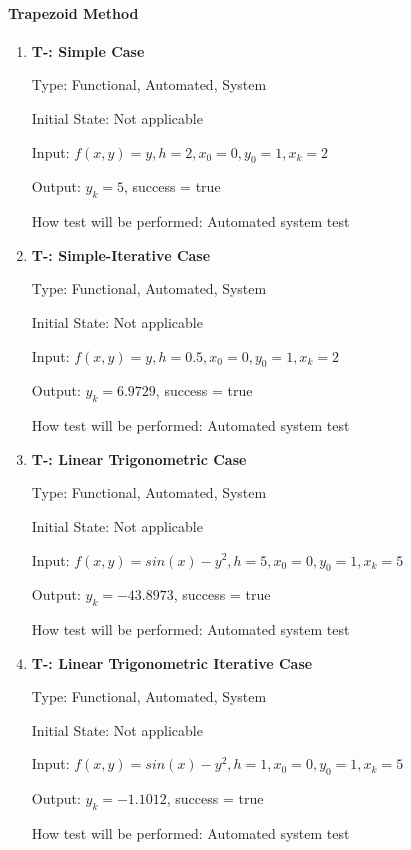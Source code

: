 \documentclass[12pt, titlepage]{article}
\newcounter{tnum} %
\begin{document}
\paragraph{Trapezoid Method}
\begin{enumerate}

\item{\textbf{T-\thetnum \label{t-trap_simple}: Simple Case}}

Type: Functional, Automated, System %
					
Initial State: Not applicable
					
Input: $f(x, y) = y, h = 2, x_0 = 0, y_0 = 1, x_k = 2$
					
Output: $y_k = 5$, success = true
					
How test will be performed: Automated system test

\item{\textbf{T-\thetnum \label{t-trap_simpleiterative}: Simple-Iterative Case}}

Type: Functional, Automated, System %
					
Initial State: Not applicable
					
Input: $f(x, y) = y, h = 0.5, x_0 = 0, y_0 = 1, x_k = 2$
					
Output: $y_k = 6.9729$, success = true
					
How test will be performed: Automated system test

\item{\textbf{T-\thetnum \label{t-trap_nonlinear}: Linear Trigonometric Case}}

Type: Functional, Automated, System %
					
Initial State: Not applicable
					
Input: $f(x, y) = sin(x) - y^2, h = 5, x_0 = 0, y_0 = 1, x_k = 5$
					
Output: $y_k = -43.8973$, success = true
					
How test will be performed: Automated system test

\item{\textbf{T-\thetnum \label{t-trap_nonlineariterative}: Linear Trigonometric Iterative Case}}

Type: Functional, Automated, System %
					
Initial State: Not applicable
					
Input: $f(x, y) = sin(x) - y^2, h = 1, x_0 = 0, y_0 = 1, x_k = 5$
					
Output: $y_k = -1.1012$, success = true
					
How test will be performed: Automated system test

\end{enumerate}
\end{document}
